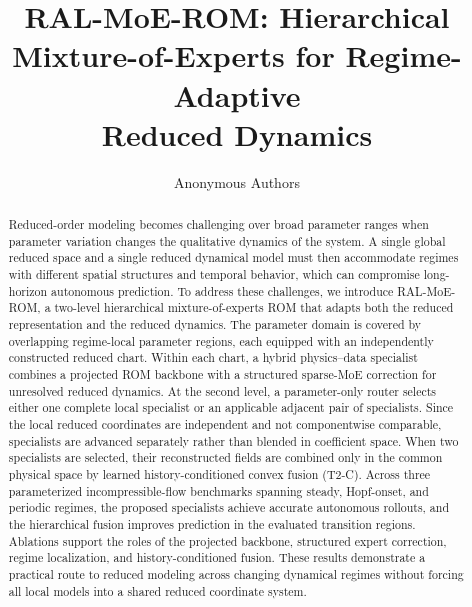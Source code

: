 \documentclass{article}
\title{RAL-MoE-ROM: Hierarchical\\
Mixture-of-Experts for Regime-Adaptive\\
Reduced Dynamics}
\author{Anonymous Authors}
\begin{document}
\raggedbottom

\maketitle

\begin{abstract}
Reduced-order modeling becomes challenging over broad parameter ranges when parameter variation changes the qualitative dynamics of the system. A single global reduced space and a single reduced dynamical model must then accommodate regimes with different spatial structures and temporal behavior, which can compromise long-horizon autonomous prediction. To address these challenges, we introduce RAL-MoE-ROM, a two-level hierarchical mixture-of-experts ROM that adapts both the reduced representation and the reduced dynamics. The parameter domain is covered by overlapping regime-local parameter regions, each equipped with an independently constructed reduced chart. Within each chart, a hybrid physics--data specialist combines a projected ROM backbone with a structured sparse-MoE correction for unresolved reduced dynamics. At the second level, a parameter-only router selects either one complete local specialist or an applicable adjacent pair of specialists. Since the local reduced coordinates are independent and not componentwise comparable, specialists are advanced
separately rather than blended in coefficient space. When two specialists are selected, their reconstructed fields are combined only in the common physical space by learned history-conditioned convex fusion (T2-C). Across three parameterized incompressible-flow benchmarks spanning steady, Hopf-onset, and periodic regimes, the proposed specialists achieve accurate autonomous rollouts, and the hierarchical fusion improves prediction in the evaluated transition regions. Ablations support the roles of the projected
backbone, structured expert correction, regime localization, and
history-conditioned fusion. These results demonstrate a practical route to reduced modeling across changing dynamical regimes without forcing all
local models into a shared reduced coordinate system.
\end{abstract}





\FloatBarrier

\end{document}
